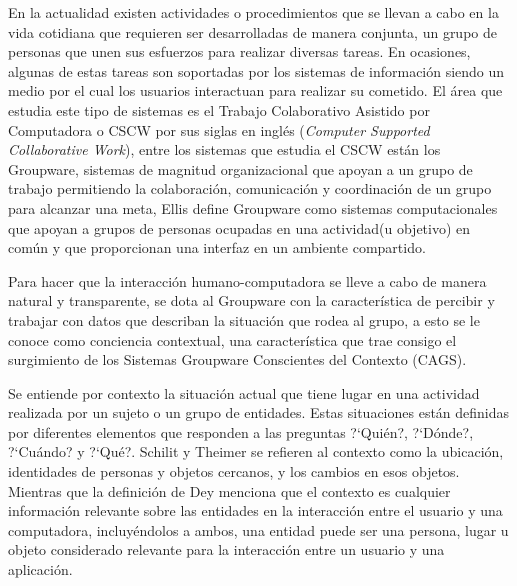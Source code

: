 En la actualidad existen actividades o procedimientos que se llevan a cabo en la vida cotidiana que requieren ser desarrolladas de manera conjunta, un grupo de personas que unen sus esfuerzos para realizar diversas tareas. En ocasiones, algunas de estas tareas son soportadas por los sistemas de informaci\'on siendo un medio por el cual los usuarios interactuan para realizar su cometido. El \'area que estudia este tipo de sistemas es el Trabajo Colaborativo Asistido por Computadora o CSCW por sus siglas en ingl\'es (\textit{Computer Supported Collaborative Work}), entre los sistemas que estudia el CSCW est\'an los Groupware, sistemas de magnitud organizacional que apoyan a un grupo de trabajo permitiendo la colaboraci\'on, comunicaci\'on y coordinaci\'on de un grupo para alcanzar una meta, Ellis\citep{ellis1991groupware} define Groupware como sistemas computacionales que apoyan a grupos de personas ocupadas en una actividad(u objetivo) en com\'un y que proporcionan una interfaz en un ambiente compartido.

Para hacer que la interacci\'on humano-computadora se lleve a cabo de manera natural y transparente, se dota al Groupware con la caracter\'istica de percibir y trabajar con datos que describan la situaci\'on que rodea al grupo, a esto se le conoce como conciencia contextual, una caracter\'istica que trae consigo el surgimiento de los Sistemas Groupware Conscientes del Contexto (CAGS).

Se entiende por contexto la situaci\'on actual que tiene lugar en una actividad realizada por un sujeto o un grupo de entidades. Estas situaciones est\'an definidas por diferentes elementos que responden a las preguntas ?`Qui\'en?, ?`D\'onde?, ?`Cu\'ando? y ?`Qu\'e?. Schilit y Theimer \citep{schillit1994disseminating} se refieren al contexto como la ubicaci\'on, identidades de personas y objetos cercanos, y los cambios en esos objetos. Mientras que la definici\'on de Dey \citep{dey2001conceptual} menciona que el contexto es cualquier informaci\'on relevante sobre las entidades en la interacci\'on entre el usuario y una computadora, incluy\'endolos a ambos, una entidad puede ser una persona, lugar u objeto considerado relevante para la interacci\'on entre un usuario y una aplicaci\'on.

